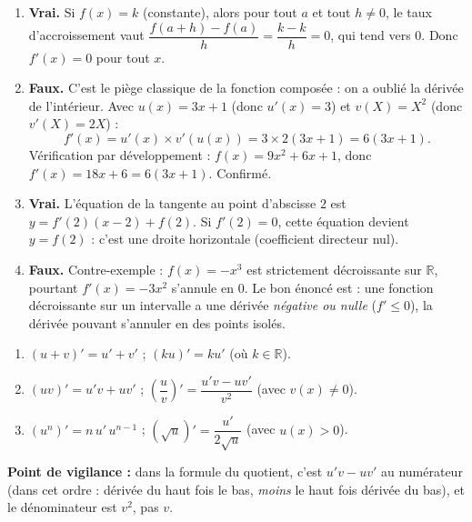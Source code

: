 \documentclass[11pt]{article}
\begin{document}
\begin{corrige}
\begin{enumerate}
\item \textbf{Vrai.} Si $f(x)=k$ (constante), alors pour tout $a$ et tout $h\neq 0$, le taux d'accroissement vaut $\dfrac{f(a+h)-f(a)}{h}=\dfrac{k-k}{h}=0$, qui tend vers $0$. Donc $f'(x)=0$ pour tout $x$.
\item \textbf{Faux.} C'est le piège classique de la fonction composée : on a oublié la dérivée de l'intérieur. Avec $u(x)=3x+1$ (donc $u'(x)=3$) et $v(X)=X^2$ (donc $v'(X)=2X$) :
\[ f'(x) = u'(x)\times v'(u(x)) = 3\times 2(3x+1) = 6(3x+1). \]
Vérification par développement : $f(x)=9x^2+6x+1$, donc $f'(x)=18x+6=6(3x+1)$. Confirmé.
\item \textbf{Vrai.} L'équation de la tangente au point d'abscisse $2$ est $y=f'(2)(x-2)+f(2)$. Si $f'(2)=0$, cette équation devient $y=f(2)$ : c'est une droite horizontale (coefficient directeur nul).
\item \textbf{Faux.} Contre-exemple : $f(x)=-x^3$ est strictement décroissante sur $\mathbb{R}$, pourtant $f'(x)=-3x^2$ s'annule en $0$. Le bon énoncé est : une fonction décroissante sur un intervalle a une dérivée \emph{négative ou nulle} ($f'\le 0$), la dérivée pouvant s'annuler en des points isolés.
\end{enumerate}
\end{corrige}

\begin{corrige}
\begin{enumerate}
\item $(u+v)' = u'+v'$ \quad ; \quad $(ku)' = ku'$ (où $k\in\mathbb{R}$).
\item $(uv)' = u'v+uv'$ \quad ; \quad $\left(\dfrac{u}{v}\right)' = \dfrac{u'v-uv'}{v^2}$ (avec $v(x)\neq 0$).
\item $(u^n)' = n\,u'\,u^{n-1}$ \quad ; \quad $(\sqrt{u})' = \dfrac{u'}{2\sqrt{u}}$ (avec $u(x)>0$).
\end{enumerate}
\textbf{Point de vigilance :} dans la formule du quotient, c'est $u'v-uv'$ au numérateur (dans cet ordre : dérivée du haut fois le bas, \emph{moins} le haut fois dérivée du bas), et le dénominateur est $v^2$, pas $v$.
\end{corrige}
\end{document}
